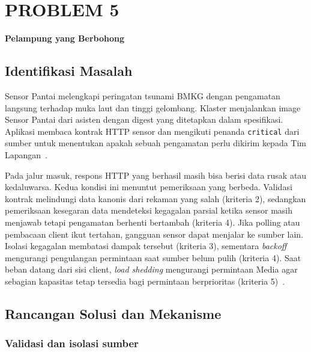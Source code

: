 \chapter{PROBLEM 5}
\label{chap:problem-5}

\begin{center}\large\bfseries Pelampung yang Berbohong\end{center}

\section{Identifikasi Masalah}

Sensor Pantai melengkapi peringatan tsunami BMKG dengan pengamatan langsung terhadap muka laut dan tinggi gelombang. Klaster menjalankan image Sensor Pantai dari asisten dengan digest yang ditetapkan dalam spesifikasi. Aplikasi membaca kontrak HTTP sensor dan mengikuti penanda \texttt{critical} dari sumber untuk menentukan apakah sebuah pengamatan perlu dikirim kepada Tim Lapangan~\cite{sensor}.

Pada jalur masuk, respons HTTP yang berhasil masih bisa berisi data rusak atau kedaluwarsa. Kedua kondisi ini menuntut pemeriksaan yang berbeda. Validasi kontrak melindungi data kanonis dari rekaman yang salah (kriteria 2), sedangkan pemeriksaan kesegaran data mendeteksi kegagalan parsial ketika sensor masih menjawab tetapi pengamatan berhenti bertambah (kriteria 4). Jika polling atau pembacaan client ikut tertahan, gangguan sensor dapat menjalar ke sumber lain. Isolasi kegagalan membatasi dampak tersebut (kriteria 3), sementara \textit{backoff} mengurangi pengulangan permintaan saat sumber belum pulih (kriteria 4). Saat beban datang dari sisi client, \textit{load shedding} mengurangi permintaan Media agar sebagian kapasitas tetap tersedia bagi permintaan berprioritas (kriteria 5)~\cite{kleppmann2017,sre}.

\section{Rancangan Solusi dan Mekanisme}

\subsection{Validasi dan isolasi sumber}

